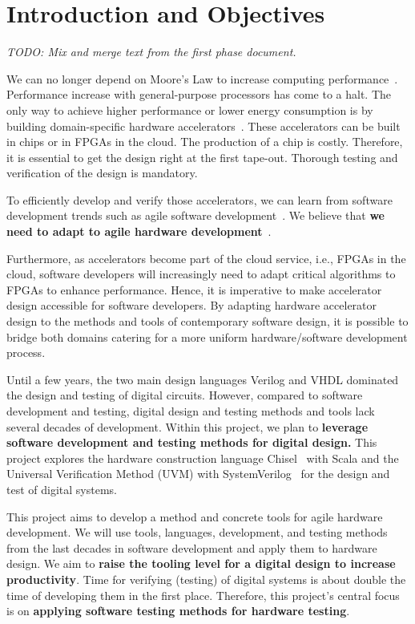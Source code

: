 \documentclass[fleqn,12pt]{article}
\newcommand{\todo}[1]{{\it TODO: #1}}
\begin{document}
\section{Introduction and Objectives}
\label{sec:objectives}

\todo{Mix and merge text from the first phase document.}

We can no longer depend on Moore's Law to increase computing performance~\cite{dark-silicon:2011}.
Performance increase with general-purpose processors has come to a halt.
The only way to achieve higher performance or lower energy consumption
is by building domain-specific hardware accelerators~\cite{domain-hw-acc:2020}.
These accelerators can be built in chips or in FPGAs in the cloud.
The production of a chip is costly. Therefore, it is essential to get
the design right at the first tape-out. Thorough testing and verification of the design is mandatory.

To efficiently develop and verify those accelerators, we can learn from software development trends such as agile software development~\cite{agile:manifesto}.
We believe that {\bf we need to adapt to agile hardware development}~\cite{henn-patt:turing:2019}.

Furthermore, as accelerators become part of the cloud service, i.e., FPGAs in the cloud,
software developers will increasingly need to adapt critical algorithms to FPGAs to enhance performance.
Hence, it is imperative to make accelerator design accessible for software developers.
By adapting hardware accelerator design to the methods and tools of contemporary software design,
it is possible to bridge both domains catering for a more uniform hardware/software development process.

Until a few years, the two main design languages Verilog and VHDL dominated the
design and testing of digital circuits.
However, compared to software development and testing, digital design and testing methods
and tools lack several decades of development. Within this project, we plan to
{\bf leverage software development and testing methods for digital design.}
This project explores the hardware construction language Chisel~\cite{chisel:dac2012} with Scala
and the Universal Verification Method (UVM) with SystemVerilog~\cite{SystemVerilog} for
the design and test of digital systems.

This project aims to develop a method and concrete tools for agile hardware development.
We will use tools, languages, development, and testing methods from the last decades in
software development and apply them to hardware design.
We aim to {\bf raise the tooling level for a digital design to increase productivity}.
Time for verifying (testing) of digital systems is about double the time of developing
them in the first place.
Therefore, this project's central focus is on {\bf applying software
testing methods for hardware testing}.
\end{document}
